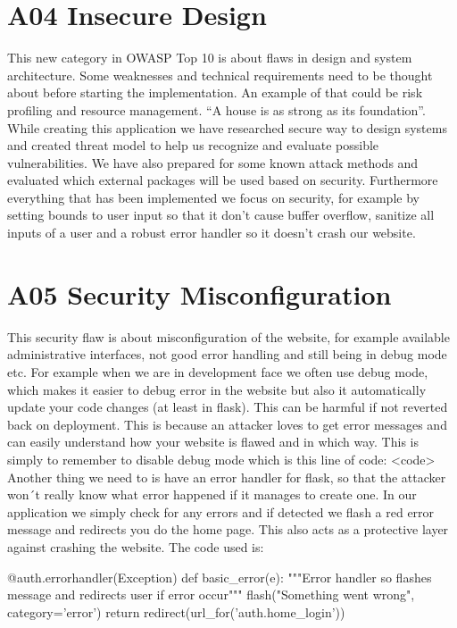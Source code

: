 \section{A04 Insecure Design}

This new category in OWASP Top 10 is about flaws in design and system architecture. Some weaknesses and technical requirements need to be thought about before starting the implementation. An example of that could be risk profiling and resource management. “A house is as strong as its foundation”. 
While creating this application we have researched secure way to design systems and created threat model to help us recognize and evaluate possible vulnerabilities. We have also prepared for some known attack methods and evaluated which external packages will be used based on security. Furthermore everything that has been implemented we focus on security, for example by setting bounds to user input so that it don’t cause buffer overflow, sanitize all inputs of a user and a robust error handler so it doesn’t crash our website. 

\section{A05 Security Misconfiguration}

This security flaw is about misconfiguration of the website, for example available administrative interfaces, not good error handling and still being in debug mode etc.
For example when we are in development face we often use debug mode, which makes it easier to debug error in the website but also it automatically update your code changes (at least in flask). This can be harmful if not reverted back on deployment. This is because an attacker loves to get error messages and can easily understand how your website is flawed and in which way.  This is simply to remember to disable debug mode which is this line of code: <code>
Another thing we need to is have an error handler for flask, so that the attacker won´t really know what error happened if it manages to create one. In our application we simply check for any errors and if detected we flash a red error message and redirects you do the home page. This also acts as a protective layer against crashing the website. The code used is:

\begin{python}
@auth.errorhandler(Exception)
def basic_error(e):
    """Error handler so flashes message
    and redirects user if error occur"""
    flash("Something went wrong", category='error')
    return redirect(url_for('auth.home_login'))
\end{python}

